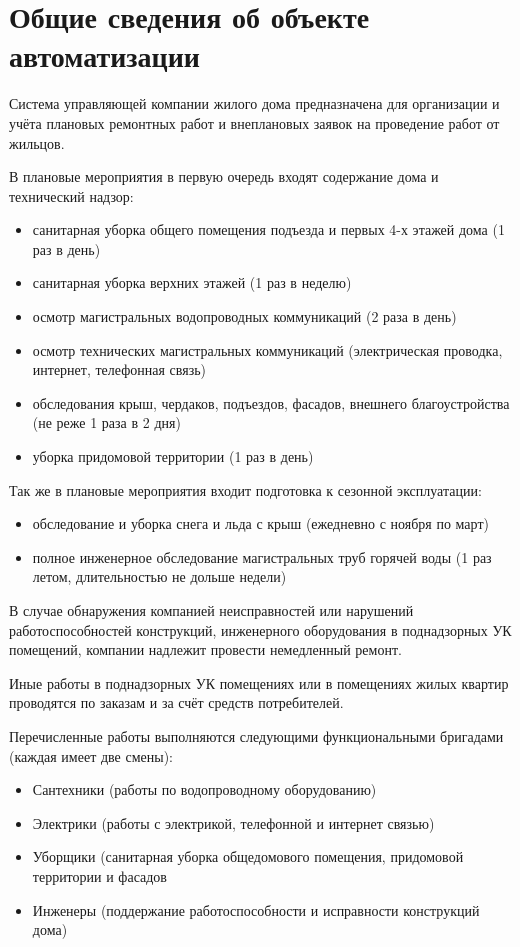 \section{Общие сведения об объекте автоматизации}

Система управляющей компании жилого дома предназначена для организации и учёта плановых ремонтных работ и внеплановых заявок на проведение работ от жильцов.

В плановые мероприятия в первую очередь входят содержание дома и технический надзор:
\begin{itemize}
\item санитарная уборка общего помещения подъезда и первых 4-х этажей дома (1 раз в день)
\item санитарная уборка верхних этажей (1 раз в неделю)
\item осмотр магистральных водопроводных коммуникаций (2 раза в день)
\item осмотр технических магистральных коммуникаций (электрическая проводка, интернет, телефонная связь)
\item обследования крыш, чердаков, подъездов, фасадов, внешнего благоустройства (не реже 1 раза в 2 дня)
\item уборка придомовой территории (1 раз в день)
\end{itemize}

Так же в плановые мероприятия входит подготовка к сезонной эксплуатации:

\begin{itemize}
\item обследование и уборка снега и льда с крыш (ежедневно с ноября по март)
\item полное инженерное обследование магистральных труб горячей воды (1 раз летом, длительностью не дольше недели)
\end{itemize}
В случае обнаружения компанией неисправностей или нарушений работоспособностей конструкций, инженерного оборудования в поднадзорных УК помещений, компании надлежит провести немедленный ремонт.

Иные работы в поднадзорных УК помещениях или в помещениях жилых квартир проводятся по заказам и за счёт средств потребителей. 

Перечисленные работы выполняются следующими функциональными бригадами (каждая имеет две смены):
\begin{itemize}
\item Сантехники (работы по водопроводному оборудованию)
\item Электрики (работы с электрикой, телефонной и интернет связью)
\item Уборщики (санитарная уборка общедомового помещения, придомовой территории и фасадов
\item Инженеры (поддержание работоспособности и исправности конструкций дома)
\end{itemize}

